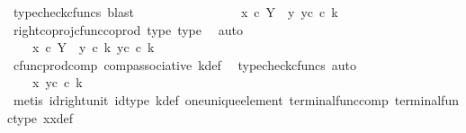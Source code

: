 \begin{isabellebody}
\ {\isacharparenleft}{\kern0pt}typecheck{\isacharunderscore}{\kern0pt}cfuncs{\isacharcomma}{\kern0pt}\ blast{\isacharparenright}{\kern0pt}\isanewline
\ \ \ \ \ \ \ \ \ \ \isamarkupfalse%
\ \isamarkupfalse%
\ {\isachardoublequoteopen}{\isachardot}{\kern0pt}{\isachardot}{\kern0pt}{\isachardot}{\kern0pt}\ {\isacharequal}{\kern0pt}\ \ {\isasymlangle}x{}\ {\isasymcirc}\isactrlsub c\ {\isasymbeta}\isactrlbsub Y\ {\isasymsetminus}\ {\isacharparenleft}{\kern0pt}{\isasymone}{\isacharcomma}{\kern0pt}y{}{\isacharparenright}{\kern0pt}\isactrlesub {\isacharcomma}{\kern0pt}\ y{}\isactrlsup c{\isasymrangle}\ {\isasymcirc}\isactrlsub c\ k{\isachardoublequoteclose}\isanewline
\ \ \ \ \ \ \ \ \ \ \ \ \isamarkupfalse%
\ right{\isacharunderscore}{\kern0pt}coproj{\isacharunderscore}{\kern0pt}cfunc{\isacharunderscore}{\kern0pt}coprod\ type{}\ type{}\ \isamarkupfalse%
\ auto\isanewline
\ \ \ \ \ \ \ \ \ \ \isamarkupfalse%
\ \isamarkupfalse%
\ {\isachardoublequoteopen}{\isachardot}{\kern0pt}{\isachardot}{\kern0pt}{\isachardot}{\kern0pt}\ {\isacharequal}{\kern0pt}\ \ {\isasymlangle}x{}\ {\isasymcirc}\isactrlsub c\ {\isasymbeta}\isactrlbsub Y\ {\isasymsetminus}\ {\isacharparenleft}{\kern0pt}{\isasymone}{\isacharcomma}{\kern0pt}y{}{\isacharparenright}{\kern0pt}\isactrlesub \ {\isasymcirc}\isactrlsub c\ k{\isacharcomma}{\kern0pt}\ y{}\isactrlsup c\ {\isasymcirc}\isactrlsub c\ k\ {\isasymrangle}{\isachardoublequoteclose}\isanewline
\ \ \ \ \ \ \ \ \ \ \ \ \isamarkupfalse%
\ cfunc{\isacharunderscore}{\kern0pt}prod{\isacharunderscore}{\kern0pt}comp\ comp{\isacharunderscore}{\kern0pt}associative{}\ k{\isacharunderscore}{\kern0pt}def\ \isamarkupfalse%
\ {\isacharparenleft}{\kern0pt}typecheck{\isacharunderscore}{\kern0pt}cfuncs{\isacharcomma}{\kern0pt}\ auto{\isacharparenright}{\kern0pt}\isanewline
\ \ \ \ \ \ \ \ \ \ \isamarkupfalse%
\ \isamarkupfalse%
\ {\isachardoublequoteopen}{\isachardot}{\kern0pt}{\isachardot}{\kern0pt}{\isachardot}{\kern0pt}\ {\isacharequal}{\kern0pt}\ \ {\isasymlangle}x{}{\isacharcomma}{\kern0pt}\ y{}\isactrlsup c\ {\isasymcirc}\isactrlsub c\ k{\isasymrangle}{\isachardoublequoteclose}\isanewline
\ \ \ \ \ \ \ \ \ \ \ \ \isamarkupfalse%
\ {\isacharparenleft}{\kern0pt}metis\ id{\isacharunderscore}{\kern0pt}right{\isacharunderscore}{\kern0pt}unit{}\ id{\isacharunderscore}{\kern0pt}type\ k{\isacharunderscore}{\kern0pt}def\ one{\isacharunderscore}{\kern0pt}unique{\isacharunderscore}{\kern0pt}element\ terminal{\isacharunderscore}{\kern0pt}func{\isacharunderscore}{\kern0pt}comp\ terminal{\isacharunderscore}{\kern0pt}func{\isacharunderscore}{\kern0pt}type\ x{}x{}{\isacharunderscore}{\kern0pt}def{\isacharparenleft}{\kern0pt}{}{\isacharparenright}{\kern0pt}{\isacharparenright}{\kern0pt}\isanewline

\end{isabellebody}
